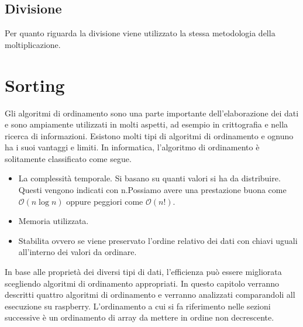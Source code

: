 \documentclass[12pt, a4paper]{report}
\begin{document}
\vspace{2cm}

\subsection{Divisione}
Per quanto riguarda la divisione viene utilizzato la stessa metodologia della moltiplicazione.



\newpage
\section{Sorting}
Gli algoritmi di ordinamento sono una parte importante dell'elaborazione dei dati e sono ampiamente utilizzati in molti aspetti, ad esempio in crittografia e nella ricerca di informazioni. Esistono molti tipi di algoritmi di ordinamento e ognuno ha i suoi vantaggi e limiti. In informatica, l'algoritmo di ordinamento è solitamente classificato come segue.

\begin{itemize}
	\item La complessità temporale. Si basano su quanti valori si ha da distribuire. Questi vengono indicati con n.Possiamo avere una prestazione buona come $\mathcal{O}(n\log{}n)$ oppure peggiori come $\mathcal{O}(n!)$.
	\item Memoria utilizzata.
	\item Stabilita ovvero se viene preservato l'ordine relativo dei dati con chiavi uguali all'interno dei valori da ordinare.
\end{itemize}

In base alle proprietà dei diversi tipi di dati, l'efficienza può essere migliorata scegliendo algoritmi di ordinamento appropriati. In questo capitolo verranno descritti quattro algoritmi di ordinamento e verranno analizzati comparandoli all esecuzione su raspberry. L'ordinamento a cui si fa riferimento nelle sezioni successive è un ordinamento di array da mettere in ordine non decrescente.
\end{document}
